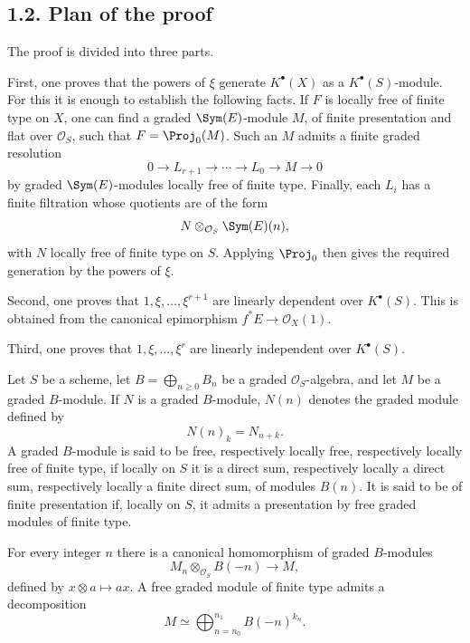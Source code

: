 \subsection*{1.2. Plan of the proof}
The proof is divided into three parts.

First, one proves that the powers of \(\xi\) generate \(K^\bullet(X)\) as a \(K^\bullet(S)\)-module. For this it is enough to establish the following facts. If \(F\) is locally free of finite type on \(X\), one can find a graded \(\Sym(E)\)-module \(M\), of finite presentation and flat over \(\mathcal O_S\), such that \(F=\Proj_0(M)\). Such an \(M\) admits a finite graded resolution
\[
  0\longrightarrow L_{r+1}\longrightarrow \cdots \longrightarrow L_0\longrightarrow M\longrightarrow 0
\]
by graded \(\Sym(E)\)-modules locally free of finite type. Finally, each \(L_i\) has a finite filtration whose quotients are of the form
\[
  N\otimes_{\mathcal O_S}\Sym(E)(n),
\]
with \(N\) locally free of finite type on \(S\). Applying \(\Proj_0\) then gives the required generation by the powers of \(\xi\).

Second, one proves that \(1,\xi,\ldots,\xi^{r+1}\) are linearly dependent over \(K^\bullet(S)\). This is obtained from the canonical epimorphism \(f^*E\to\mathcal O_X(1)\).

Third, one proves that \(1,\xi,\ldots,\xi^r\) are linearly independent over \(K^\bullet(S)\).

Let \(S\) be a scheme, let \(B=\bigoplus_{n\geq 0}B_n\) be a graded \(\mathcal O_S\)-algebra, and let \(M\) be a graded \(B\)-module. If \(N\) is a graded \(B\)-module, \(N(n)\) denotes the graded module defined by
\[
  N(n)_k=N_{n+k}.
\]
A graded \(B\)-module is said to be free, respectively locally free, respectively locally free of finite type, if locally on \(S\) it is a direct sum, respectively locally a direct sum, respectively locally a finite direct sum, of modules \(B(n)\). It is said to be of finite presentation if, locally on \(S\), it admits a presentation by free graded modules of finite type.

For every integer \(n\) there is a canonical homomorphism of graded \(B\)-modules
\begin{equation}\tag{1.2.1}
  M_n\otimes_{\mathcal O_S}B(-n)\longrightarrow M,
\end{equation}
defined by \(x\otimes a\mapsto ax\). A free graded module of finite type admits a decomposition
\begin{equation}\tag{1.2.2}
  M\simeq \bigoplus_{n=n_0}^{n_1} B(-n)^{k_n}.
\end{equation}

